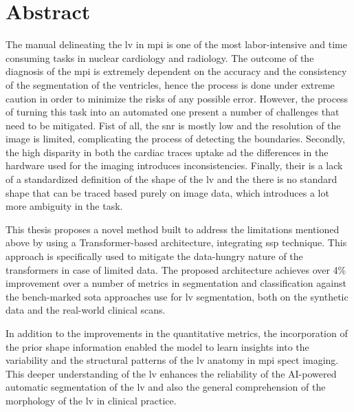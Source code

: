 \chapter*{Abstract}

The manual delineating the \gls{lv} in \gls{mpi} is one of the most labor-intensive and time consuming tasks in nuclear cardiology and radiology. The outcome of the diagnosis of the \gls{mpi} is extremely dependent on the accuracy and the consistency of the segmentation of the ventricles, hence the process is done under extreme caution in order to minimize the risks of any possible error. However, the process of turning this task into an automated one present a number of challenges that need to be mitigated. Fist of all, the \gls{snr} is mostly low and the resolution of the image is limited, complicating the process of detecting the boundaries. Secondly, the high disparity in both the cardiac traces uptake ad the differences in the hardware used for the imaging introduces inconsistencies. Finally, their is a lack of a standardized definition of the shape of the \gls{lv} and the there is no standard shape that can be traced based purely on image data, which introduces a lot more ambiguity in the task.

This thesis proposes a novel method built to address the limitations mentioned above by using a Transformer-based architecture, integrating \gls{ssp} technique. This approach is specifically used to mitigate the data-hungry nature of the transformers in case of limited data. The proposed architecture achieves over 4\% improvement over a number of metrics in segmentation and classification against the bench-marked \gls{sota} approaches use for \gls{lv} segmentation, both on the synthetic data and the real-world clinical scans.

In addition to the improvements in the quantitative metrics, the incorporation of the prior shape information enabled the model to learn insights into the variability and the structural patterns of the \gls{lv} anatomy in \gls{mpi} \gls{spect} imaging. This deeper understanding of the \gls{lv} enhances the reliability of the AI-powered automatic segmentation of the \gls{lv} and also the general comprehension of the morphology of the \gls{lv} in clinical practice.